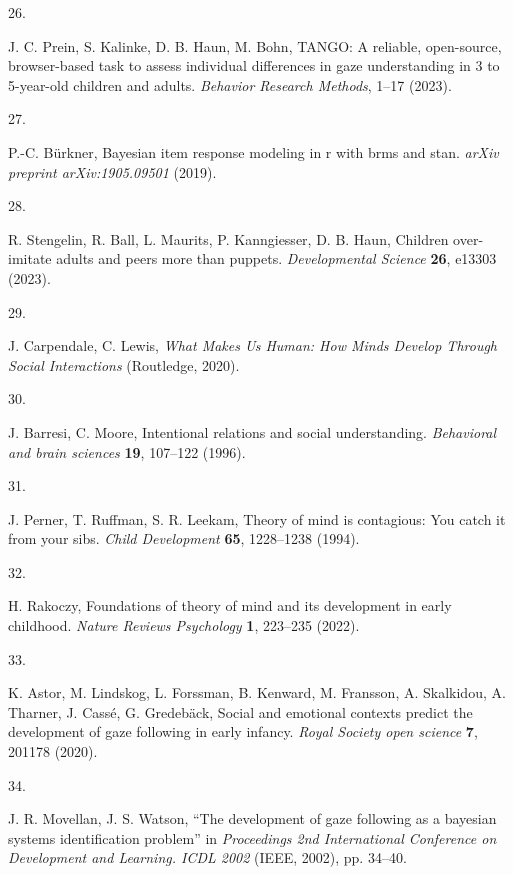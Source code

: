 \documentclass[
  man,floatsintext]{apa6}
\newlength{\cslhangindent}
\newlength{\csllabelwidth}
\newlength{\cslentryspacingunit} %
\newenvironment{CSLReferences}[2] %
 {%
  \setlength{\parindent}{0pt}
  \ifodd #1
  \let\oldpar\par
  \def\par{\hangindent=\cslhangindent\oldpar}
  \fi
  \setlength{\parskip}{#2\cslentryspacingunit}
 }%
 {}
\newcommand{\CSLLeftMargin}[1]{\parbox[t]{\csllabelwidth}{#1}}
\newcommand{\CSLRightInline}[1]{\parbox[t]{\linewidth - \csllabelwidth}{#1}\break}
\begin{document}
\begin{CSLReferences}{0}{0}
\leavevmode{}%
\CSLLeftMargin{26. }%
\CSLRightInline{J. C. Prein, S. Kalinke, D. B. Haun, M. Bohn, TANGO: A reliable, open-source, browser-based task to assess individual differences in gaze understanding in 3 to 5-year-old children and adults. \emph{Behavior Research Methods}, 1--17 (2023).}

\leavevmode{}%
\CSLLeftMargin{27. }%
\CSLRightInline{P.-C. Bürkner, Bayesian item response modeling in r with brms and stan. \emph{arXiv preprint arXiv:1905.09501} (2019).}

\leavevmode{}%
\CSLLeftMargin{28. }%
\CSLRightInline{R. Stengelin, R. Ball, L. Maurits, P. Kanngiesser, D. B. Haun, Children over-imitate adults and peers more than puppets. \emph{Developmental Science} \textbf{26}, e13303 (2023).}

\leavevmode{}%
\CSLLeftMargin{29. }%
\CSLRightInline{J. Carpendale, C. Lewis, \emph{What Makes Us Human: How Minds Develop Through Social Interactions} (Routledge, 2020).}

\leavevmode{}%
\CSLLeftMargin{30. }%
\CSLRightInline{J. Barresi, C. Moore, Intentional relations and social understanding. \emph{Behavioral and brain sciences} \textbf{19}, 107--122 (1996).}

\leavevmode{}%
\CSLLeftMargin{31. }%
\CSLRightInline{J. Perner, T. Ruffman, S. R. Leekam, Theory of mind is contagious: You catch it from your sibs. \emph{Child Development} \textbf{65}, 1228--1238 (1994).}

\leavevmode{}%
\CSLLeftMargin{32. }%
\CSLRightInline{H. Rakoczy, Foundations of theory of mind and its development in early childhood. \emph{Nature Reviews Psychology} \textbf{1}, 223--235 (2022).}

\leavevmode{}%
\CSLLeftMargin{33. }%
\CSLRightInline{K. Astor, M. Lindskog, L. Forssman, B. Kenward, M. Fransson, A. Skalkidou, A. Tharner, J. Cassé, G. Gredebäck, Social and emotional contexts predict the development of gaze following in early infancy. \emph{Royal Society open science} \textbf{7}, 201178 (2020).}

\leavevmode{}%
\CSLLeftMargin{34. }%
\CSLRightInline{J. R. Movellan, J. S. Watson, {``The development of gaze following as a bayesian systems identification problem''} in \emph{Proceedings 2nd International Conference on Development and Learning. ICDL 2002} (IEEE, 2002), pp. 34--40.}


\end{CSLReferences}
\end{document}
